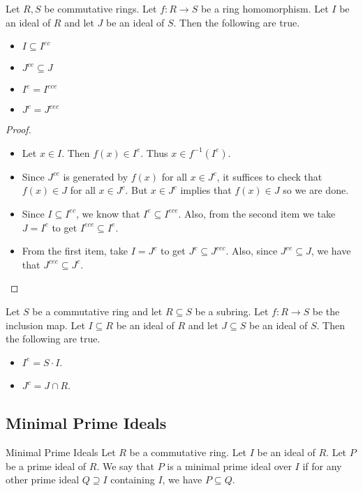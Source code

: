 \documentclass[a4paper]{article}
\begin{document}
\begin{prp}{}{} Let $R,S$ be commutative rings. Let $f:R\to S$ be a ring homomorphism. Let $I$ be an ideal of $R$ and let $J$ be an ideal of $S$. Then the following are true. 
\begin{itemize}
\item $I\subseteq I^{ec}$
\item $J^{ce}\subseteq J$
\item $I^e=I^{ece}$
\item $J^c=J^{cec}$
\end{itemize} \tcbline
\begin{proof}~\\
\begin{itemize}
\item Let $x\in I$. Then $f(x)\in I^e$. Thus $x\in f^{-1}(I^e)$. 
\item Since $J^{ce}$ is generated by $f(x)$ for all $x\in J^c$, it suffices to check that $f(x)\in J$ for all $x\in J^c$. But $x\in J^c$ implies that $f(x)\in J$ so we are done. 
\item Since $I\subseteq I^{ec}$, we know that $I^e\subseteq I^{ece}$. Also, from the second item we take $J=I^e$ to get $I^{ece}\subseteq I^e$. 
\item From the first item, take $I=J^c$ to get $J^c\subseteq J^{cec}$. Also, since $J^{ce}\subseteq J$, we have that $J^{cec}\subseteq J^c$. 
\end{itemize}
\end{proof}
\end{prp}

\begin{eg}{}{} Let $S$ be a commutative ring and let $R\subseteq S$ be a subring. Let $f:R\to S$ be the inclusion map. Let $I\subseteq R$ be an ideal of $R$ and let $J\subseteq S$ be an ideal of $S$. Then the following are true. 
\begin{itemize}
\item $I^e=S\cdot I$. 
\item $J^c=J\cap R$. 
\end{itemize}
\end{eg}

\subsection{Minimal Prime Ideals}
\begin{defn}{Minimal Prime Ideals}{} Let $R$ be a commutative ring. Let $I$ be an ideal of $R$. Let $P$ be a prime ideal of $R$. We say that $P$ is a minimal prime ideal over $I$ if for any other prime ideal $Q\supseteq I$ containing $I$, we have $P\subseteq Q$. 
\end{defn}
\end{document}
